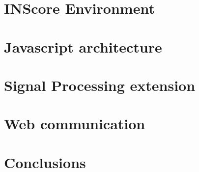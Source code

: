 \documentclass{article}
\begin{document}


\section{INScore Environment}\label{sec:inscore}

\section{Javascript architecture}\label{sec:arch}

\section{Signal Processing extension}\label{sec:faust}

\section{Web communication}



\section{Conclusions}

\balance

\end{document}
